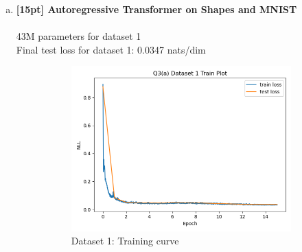 \documentclass{article}
\begin{document}
\newpage
{}

\begin{enumerate}[(a)]
\item {\bf [15pt] Autoregressive Transformer on Shapes and MNIST} \\\\
43M parameters for dataset 1 \\
Final test loss for dataset 1: 0.0347 nats/dim
\begin{figure}[H]
    \centering
    \begin{subfigure}{0.45\textwidth}
        \centering
        \includegraphics[width=\textwidth]{figures/q3_a_dset1_train_plot.png}
        \caption{Dataset 1: Training curve}
    \end{subfigure}
    \hspace{0.2in}
    \begin{subfigure}{0.45\textwidth}
        \centering

\end{subfigure}
\end{figure}
\end{enumerate}
\end{document}
